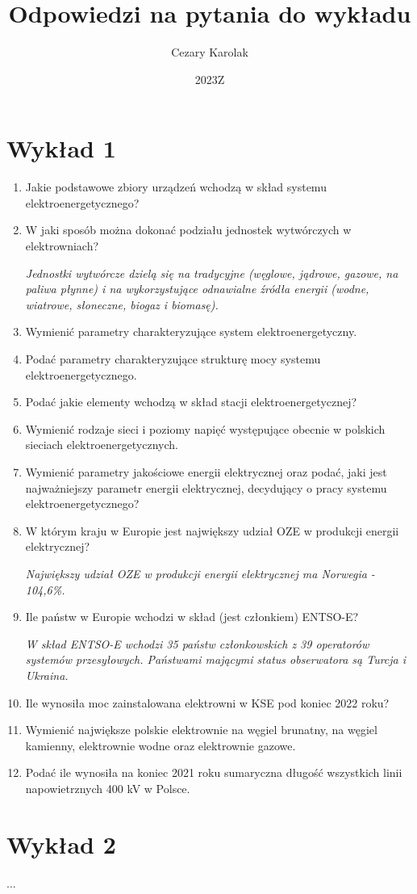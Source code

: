 \documentclass[12pt]{article}
\title{Odpowiedzi na pytania do wykładu}
\author{Cezary Karolak}
\date{2023Z}
\begin{document}
\maketitle
\tableofcontents
\newpage

\section{Wykład 1}

\begin{enumerate}
    \item{Jakie podstawowe zbiory urządzeń wchodzą w skład systemu elektroenergetycznego?}
    
    \item{W jaki sposób można dokonać podziału jednostek wytwórczych w elektrowniach?}
    
        \textit{Jednostki wytwórcze dzielą się na tradycyjne (węglowe, jądrowe, gazowe, na paliwa płynne) i na wykorzystujące odnawialne źródła energii (wodne, wiatrowe, słoneczne, biogaz i biomasę).}
    
    \item Wymienić parametry charakteryzujące system elektroenergetyczny.

    \item Podać parametry charakteryzujące strukturę mocy systemu elektroenergetycznego.
    \item Podać jakie elementy wchodzą w skład stacji elektroenergetycznej?
    \item Wymienić rodzaje sieci i poziomy napięć występujące obecnie w polskich sieciach elektroenergetycznych.
    \item Wymienić parametry jakościowe energii elektrycznej oraz podać, jaki jest najważniejszy parametr energii elektrycznej, decydujący o pracy systemu elektroenergetycznego?
    \item W którym kraju w Europie jest największy udział OZE w produkcji energii elektrycznej?

        \textit{Największy udział OZE w produkcji energii elektrycznej ma Norwegia - 104,6\%.}
        
    \item Ile państw w Europie wchodzi w skład (jest członkiem) ENTSO-E?

        \textit{W skład ENTSO-E wchodzi 35 państw członkowskich z 39 operatorów systemów przesyłowych. Państwami mającymi status obserwatora są Turcja i Ukraina.}
        
    \item Ile wynosiła moc zainstalowana elektrowni w KSE pod koniec 2022 roku?
    \item Wymienić największe polskie elektrownie na węgiel brunatny, na węgiel kamienny, elektrownie wodne oraz elektrownie gazowe.
    \item Podać ile wynosiła na koniec 2021 roku sumaryczna długość wszystkich linii napowietrznych 400 kV w Polsce.
\end{enumerate}

\section{Wykład 2}
...
\end{document}
